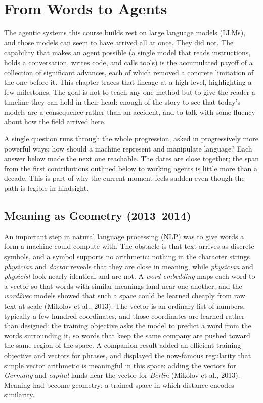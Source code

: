 \chapter{From Words to Agents}
\label{chapter:HowWeGotHere}

The agentic systems this course builds rest on large language models (LLMs), and those models can seem to have arrived all at once.
They did not.
The capability that makes an agent possible (a single model that reads instructions, holds a conversation, writes code, and calls tools) is the accumulated payoff of a collection of significant advances, each of which removed a concrete limitation of the one before it.
This chapter traces that lineage at a high level, highlighting a few milestones.
The goal is not to teach any one method but to give the reader a timeline they can hold in their head: enough of the story to see that today's models are a consequence rather than an accident, and to talk with some fluency about how the field arrived here.

A single question runs through the whole progression, asked in progressively more powerful ways: how should a machine represent and manipulate language?
Each answer below made the next one reachable.
The dates are close together; the span from the first contributions outlined below to working agents is little more than a decade.
This is part of why the current moment feels sudden even though the path is legible in hindsight.

\section{Meaning as Geometry (2013--2014)}
\label{section:MeaningAsGeometry}

An important step in natural language processing (NLP) was to give words a form a machine could compute with.
The obstacle is that text arrives as discrete symbols, and a symbol supports no arithmetic: nothing in the character strings \emph{physician} and \emph{doctor} reveals that they are close in meaning, while \emph{physician} and \emph{physicist} look nearly identical and are not.
A \emph{word embedding} maps each word to a vector so that words with similar meanings land near one another, and the \emph{word2vec} models showed that such a space could be learned cheaply from raw text at scale (Mikolov et al., 2013).
The vector is an ordinary list of numbers, typically a few hundred coordinates, and those coordinates are learned rather than designed: the training objective asks the model to predict a word from the words surrounding it, so words that keep the same company are pushed toward the same region of the space.
A companion result added an efficient training objective and vectors for phrases, and displayed the now-famous regularity that simple vector arithmetic is meaningful in this space: adding the vectors for \emph{Germany} and \emph{capital} lands near the vector for \emph{Berlin} (Mikolov et al., 2013).
Meaning had become geometry: a trained space in which distance encodes similarity.

